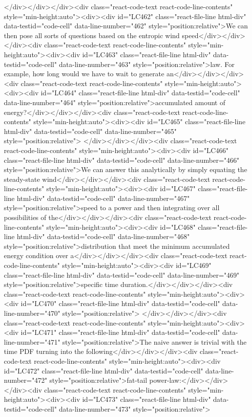 {{{</div></div></div><div class="react-code-text react-code-line-contents" style="min-height:auto"><div><div id="LC462" class="react-file-line html-div" data-testid="code-cell" data-line-number="462" style="position:relative">We can then pose all sorts of questions based on the entropic wind speed</div></div></div><div class="react-code-text react-code-line-contents" style="min-height:auto"><div><div id="LC463" class="react-file-line html-div" data-testid="code-cell" data-line-number="463" style="position:relative">law. For example, how long would we have to wait to generate an</div></div></div><div class="react-code-text react-code-line-contents" style="min-height:auto"><div><div id="LC464" class="react-file-line html-div" data-testid="code-cell" data-line-number="464" style="position:relative">accumulated amount of energy?</div></div></div><div class="react-code-text react-code-line-contents" style="min-height:auto"><div><div id="LC465" class="react-file-line html-div" data-testid="code-cell" data-line-number="465" style="position:relative">
</div></div></div><div class="react-code-text react-code-line-contents" style="min-height:auto"><div><div id="LC466" class="react-file-line html-div" data-testid="code-cell" data-line-number="466" style="position:relative">We can answer this analytically by simply equating the steady-state wind</div></div></div><div class="react-code-text react-code-line-contents" style="min-height:auto"><div><div id="LC467" class="react-file-line html-div" data-testid="code-cell" data-line-number="467" style="position:relative">speed to a power and then integrating over all possibilities of the</div></div></div><div class="react-code-text react-code-line-contents" style="min-height:auto"><div><div id="LC468" class="react-file-line html-div" data-testid="code-cell" data-line-number="468" style="position:relative">distribution that meet the minimum accumulated energy condition over a</div></div></div><div class="react-code-text react-code-line-contents" style="min-height:auto"><div><div id="LC469" class="react-file-line html-div" data-testid="code-cell" data-line-number="469" style="position:relative">specific time duration.</div></div></div><div class="react-code-text react-code-line-contents" style="min-height:auto"><div><div id="LC470" class="react-file-line html-div" data-testid="code-cell" data-line-number="470" style="position:relative">
</div></div></div><div class="react-code-text react-code-line-contents" style="min-height:auto"><div><div id="LC471" class="react-file-line html-div" data-testid="code-cell" data-line-number="471" style="position:relative">The naive answer is trivial with the time PDF turning into the following</div></div></div><div class="react-code-text react-code-line-contents" style="min-height:auto"><div><div id="LC472" class="react-file-line html-div" data-testid="code-cell" data-line-number="472" style="position:relative">fat-tail power-law:</div></div></div><div class="react-code-text react-code-line-contents" style="min-height:auto"><div><div id="LC473" class="react-file-line html-div" data-testid="code-cell" data-line-number="473" style="position:relative">
}}}
